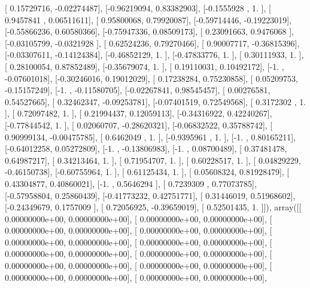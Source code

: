 \documentclass{article}
\begin{document}
       [ 0.15729716, -0.02274487],
       [-0.96219094,  0.83382903],
       [-0.1555928 ,  1.        ],
       [ 0.9457841 ,  0.06511611],
       [ 0.95800068,  0.79920087],
       [-0.59714446, -0.19223019],
       [-0.55866236,  0.60580366],
       [-0.75947336,  0.08509173],
       [ 0.23091663,  0.9476068 ],
       [-0.03105799, -0.0321928 ],
       [ 0.62524236,  0.79270466],
       [ 0.90007717, -0.36815396],
       [-0.03307611, -0.14124384],
       [-0.46852129,  1.        ],
       [-0.47833776,  1.        ],
       [ 0.30111933,  1.        ],
       [ 0.28100054,  0.87852489],
       [-0.35679074,  1.        ],
       [ 0.19110031,  0.10492172],
       [-1.        , -0.07601018],
       [-0.30246016,  0.19012029],
       [ 0.17238284,  0.75230858],
       [ 0.05209753, -0.15157249],
       [-1.        , -0.11580705],
       [-0.02267841,  0.98545457],
       [ 0.00276581,  0.54527665],
       [ 0.32462347, -0.09253781],
       [-0.07401519,  0.72549568],
       [ 0.3172302 ,  1.        ],
       [ 0.72097482,  1.        ],
       [ 0.21994437,  0.12059113],
       [-0.34316922,  0.42240267],
       [-0.77844542,  1.        ],
       [ 0.02060707, -0.28620321],
       [-0.06832522,  0.35788742],
       [ 0.90999134, -0.00475785],
       [ 0.6462049 ,  1.        ],
       [-0.9395961 ,  1.        ],
       [-1.        ,  0.80165211],
       [-0.64012258,  0.05272809],
       [-1.        , -0.13806983],
       [-1.        ,  0.08700489],
       [ 0.37481478,  0.64987217],
       [ 0.34213464,  1.        ],
       [ 0.71954707,  1.        ],
       [ 0.60228517,  1.        ],
       [ 0.04829229, -0.46150738],
       [-0.60755964,  1.        ],
       [ 0.61125434,  1.        ],
       [ 0.05608324,  0.81928479],
       [ 0.43304877,  0.40860021],
       [-1.        ,  0.5646294 ],
       [ 0.7239309 ,  0.77073785],
       [-0.57958804,  0.25860439],
       [-0.41773232,  0.42751771],
       [ 0.31446019,  0.51968602],
       [-0.24349679,  0.1757009 ],
       [ 0.72056925, -0.39659019],
       [ 0.52501435,  1.        ]]), array([[  0.00000000e+00,   0.00000000e+00],
       [  0.00000000e+00,   0.00000000e+00],
       [  0.00000000e+00,   0.00000000e+00],
       [  0.00000000e+00,   0.00000000e+00],
       [  0.00000000e+00,   0.00000000e+00],
       [  0.00000000e+00,   0.00000000e+00],
       [  0.00000000e+00,   0.00000000e+00],
       [  0.00000000e+00,   0.00000000e+00],
       [  0.00000000e+00,   0.00000000e+00],
       [  0.00000000e+00,   0.00000000e+00],
       [  0.00000000e+00,   0.00000000e+00],
       [  0.00000000e+00,   0.00000000e+00],
\end{document}
